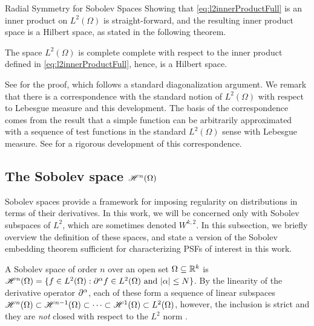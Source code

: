 \begin{chapter}{Radial Symmetry for Sobolev Spaces}
Showing that \eqref{eq:l2innerProductFull} is an inner product on $L^2(\Omega)$ is straight-forward, and the resulting inner product space is a Hilbert space, as stated in the following theorem.
\begin{thm}
The space $L^2(\Omega)$ is complete complete with respect to the inner product defined in \eqref{eq:l2innerProductFull}, hence, is a Hilbert space.
\end{thm}
See \citep{richtmyer1978principles} for the proof, which follows a standard diagonalization argument. %
We remark that there is a correspondence with the standard notion of $L^2(\Omega)$ with respect to Lebesgue measure and this development.
The basis of the correspondence comes from the result that a simple function can be arbitrarily approximated with a sequence of test functions in the standard $L^2(\Omega)$ sense with Lebesgue measure. 
See \citep{hormander1983} for a rigorous development of this correspondence.
\subsection{The Sobolev space $\mathscr H^n(\Omega)$}
Sobolev spaces provide a framework for imposing regularity on distributions in terms of their derivatives.
In this work, we will be concerned only with Sobolev subspaces of $L^2$, which are sometimes denoted $W^{k,2}$.
In this subsection, we briefly overview the definition of these spaces, and state a version of the Sobolev embedding theorem sufficient for characterizing PSFs of interest in this work.

A Sobolev space of order $n$ over an open set $\Omega \subseteq \mathbb R^k$ is $\mathscr H^n(\Omega) = \{f \in L^2(\Omega): \partial^\alpha f \in L^2(\Omega)\text{ and }|\alpha|\le N\}$.
By the linearity of the derivative operator $\partial^\alpha$, each of these form a sequence of linear subspaces $\mathscr H^n(\Omega) \subset \mathscr H^{n-1}(\Omega) \subset \dots \subset \mathscr H^1(\Omega) \subset L^2(\Omega)$, however, the inclusion is strict and they are \emph{not} closed with respect to the $L^2$ norm \citep{richtmyer1978principles}.


\end{chapter}
